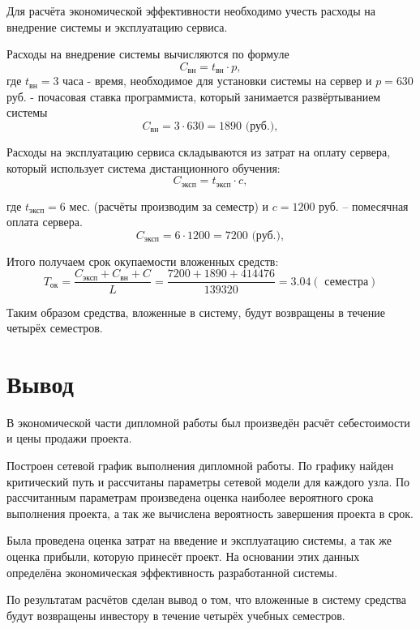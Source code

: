 Для расчёта экономической эффективности необходимо учесть расходы на внедрение системы и эксплуатацию сервиса.

Расходы на внедрение системы  вычисляются по формуле 
$$
C_{\mbox{вн}} = t_{\mbox{вн}}\cdot p,
$$
где $t_{\mbox{вн}} = 3$ часа - время, необходимое для установки системы на сервер и $p=630$ руб. - почасовая ставка программиста, который занимается развёр\-тыванием системы
$$
C_{\mbox{вн}} = 3 \cdot 630 = 1890 \mbox{ (руб.)},
$$

Расходы на эксплуатацию сервиса складываются из затрат на оплату сервера, который использует система дистанционного обучения:
$$
C_{\mbox{эксп}} = t_{\mbox{эксп}}\cdot c,
$$

где $t_{\mbox{эксп}} = 6$ мес. (расчёты производим за семестр) и  $c = 1200$ руб. – помесячная оплата сервера.
$$
C_{\mbox{эксп}} = 6 \cdot 1200 = 7200 \mbox{ (руб.)},
$$ 

Итого получаем срок окупаемости вложенных средств:
$$
T_{\mbox{ок}} = \frac{C_{\mbox{эксп}} + C_{\mbox{вн}} + C}{L} = \frac{7200+1890+414476}{139320} = 3.04 (\mbox{ семестра})
$$

Таким образом средства, вложенные в систему, будут возвращены в течение четырёх семестров.

\section{Вывод} 
В экономической части дипломной работы был произведён расчёт себес\-тоимости и цены продажи проекта.

Построен сетевой график выполнения дипломной работы. По графику найден критический путь и рассчитаны параметры сетевой модели для каждо\-го узла. По рассчитанным параметрам произведена оценка наиболее вероят\-ного срока выполнения проекта, а так же вычислена вероятность завершения проекта в срок.

Была проведена оценка затрат на введение и эксплуатацию системы, а так же оценка прибыли, которую принесёт проект. На основании этих данных определёна экономическая эффективность разработанной системы.

По результатам расчётов сделан вывод о том, что вложенные в систему средства будут возвращены инвестору в течение четырёх учебных семестров.